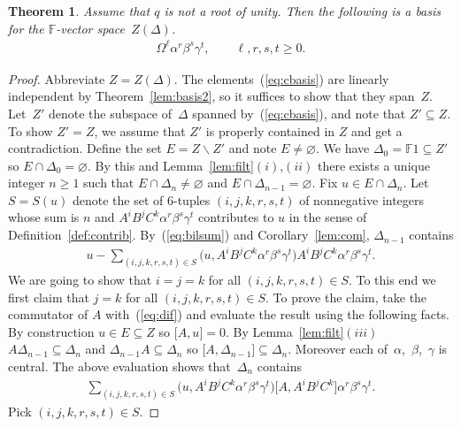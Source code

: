\documentclass[11pt]{article}
\numberwithin{equation}{section}
\newtheorem{Theorem}{Theorem}[section]
\begin{document}
\begin{Theorem}
\label{thm:centerbasis}
Assume that $q$ is not a root of unity. Then the following is a basis for
the $\mathbb F$-vector space~$Z(\Delta)$.
\begin{gather}
\Omega^\ell \alpha^r \beta^s\gamma^t, \qquad  \ell,r,s,t \geq 0.
\label{eq:cbasis}
\end{gather}
\end{Theorem}

\begin{proof}
Abbreviate $Z=Z(\Delta)$.
The elements~(\ref{eq:cbasis})
are linearly independent by
Theorem~\ref{lem:basis2},
so it suf\/f\/ices to
show that they span~$Z$.
Let~$Z'$ denote the subspace of~$\Delta$ spanned by~(\ref{eq:cbasis}), and note that
$Z' \subseteq Z$. To show
$Z'= Z$, we assume that $Z'$ is properly contained in
$Z$ and get a contradiction.
Def\/ine the set $E=Z\backslash Z'$
and note $E\not=\varnothing$.
We have
$\Delta_0=\mathbb F 1
\subseteq Z'$ so
$E \cap \Delta_0 =\varnothing$.
By this and
Lemma~\ref{lem:filt}$(i)$,$(ii)$ there exists a unique integer
$n\geq 1$ such that
$E\cap \Delta_n \not=\varnothing$ and
$E\cap \Delta_{n-1} =\varnothing$.
Fix $u \in E\cap \Delta_n$.
Let
$S=S(u)$ denote
the set of 6-tuples $(i,j,k,r,s,t)$ of nonnegative integers
whose sum is $n$ and
 $A^iB^jC^k\alpha^r\beta^s\gamma^t$
contributes to $u$ in
the sense of
Def\/inition~\ref{def:contrib}.
By~(\ref{eq:bilsum}) and Corollary~\ref{lem:com},
$\Delta_{n-1}$ contains
\begin{gather}
\label{eq:dif}
u- \sum_{(i,j,k,r,s,t) \in S}
\big( u,
A^iB^jC^k\alpha^r \beta^s \gamma^t \big)
A^iB^jC^k\alpha^r \beta^s \gamma^t.
\end{gather}
We are going to show that
$i=j=k$ for all
$(i,j,k,r,s,t) \in S$.
To this end
we f\/irst claim that $j=k$ for all
$(i,j,k,r,s,t) \in S$.
To prove the claim,
take the commutator of $A$ with~(\ref{eq:dif}) and evaluate the
result using the following facts.
By construction $u \in E \subseteq Z$
so
  $\lbrack A,u\rbrack=0$.
By Lemma~\ref{lem:filt}$(iii)$
$A\Delta_{n-1} \subseteq  \Delta_n $
and
$\Delta_{n-1}A \subseteq \Delta_n$
so
 $\lbrack A,\Delta_{n-1}\rbrack \subseteq \Delta_n$.
Moreover
 each of~$\alpha$,~$\beta$,~$\gamma$
 is central.
The above evaluation shows that~$\Delta_n$ contains
\begin{gather*}
\sum_{(i,j,k,r,s,t) \in S}
\big( u, A^iB^jC^k
\alpha^r \beta^s \gamma^t \big)
\big\lbrack A, A^iB^jC^k \big\rbrack
\alpha^r \beta^s \gamma^t.
\end{gather*}
Pick
$(i,j,k,r,s,t) \in S$.

\end{proof}
\end{document}
